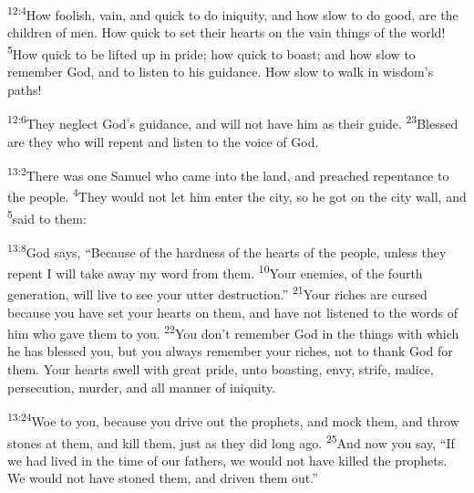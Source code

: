 \documentclass[openany,12pt,english]{book}
\newenvironment{para}{\par\pretolerance=100\tolerance=200\setlength{\emergencystretch}{0.6em}\relax}{\par}
\begin{document}
\begin{para}
    \textsuperscript{12:4}\thinspace{}How fool\-ish, vain, and quick to do in\-iq\-ui\-ty, and how slow to do good, are the chil\-dren of men. How quick to set their hearts on the vain things of the world!
    \textsuperscript{5}\thinspace{}How quick to be lifted up in pride; how quick to boast; and how slow to re\-mem\-ber God, and to lis\-ten to his guid\-ance. How slow to walk in wisdom's paths!
\end{para}

\begin{para}
    \textsuperscript{12:6}\thinspace{}They ne\-glect God's guid\-ance, and will not have him as their guide.
    \textsuperscript{23}\thinspace{}Bless\-ed are they who will re\-pent and lis\-ten to the voice of God.
\end{para}

\bigskip{}

\begin{para}
    \textsuperscript{13:2}\thinspace{}There was one Samuel who came in\-to the land, and preached re\-pent\-ance to the peo\-ple.
    \textsuperscript{4}\thinspace{}They would not let him en\-ter the cit\-y, so he got on the cit\-y wall, and
    \textsuperscript{5}\thinspace{}said to them:
\end{para}

\begin{para}
    \textsuperscript{13:8}\thinspace{}God says, “Be\-cause of the hard\-ness of the hearts of the peo\-ple, un\-less they re\-pent I will take a\-way my word from them.
    \textsuperscript{10}\thinspace{}Your enemies, of the fourth gen\-er\-a\-tion, will live to see your ut\-ter de\-struc\-tion.”
    \textsuperscript{21}\thinspace{}Your rich\-es are curs\-ed be\-cause you have set your hearts on them, and have not listened to the words of him who gave them to you.
    \textsuperscript{22}\thinspace{}You don't re\-mem\-ber God in the things with which he has bless\-ed you, but you al\-ways re\-mem\-ber your rich\-es, not to thank God for them. Your hearts swell with great pride, un\-to boasting, en\-vy, strife, mal\-ice, per\-se\-cu\-tion, mur\-der, and all man\-ner of in\-iq\-ui\-ty.
\end{para}

\begin{para}
    \textsuperscript{13:24}\thinspace{}Woe to you, be\-cause you drive out the prophets, and mock them, and throw stones at them, and kill them, just as they did long a\-go.
    \textsuperscript{25}\thinspace{}And now you say, “If we had lived in the time of our fathers, we would not have killed the prophets. We would not have stoned them, and driv\-en them out.”
\end{para}
\end{document}
